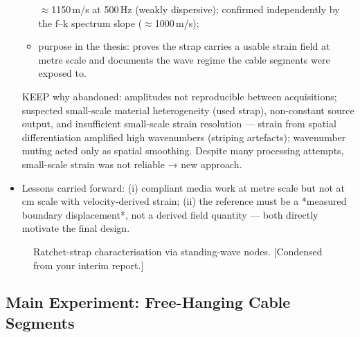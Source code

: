 \begin{itemize}
\begin{itemize}
        $\approx$1150\,m/s at 500\,Hz (weakly dispersive); confirmed
        independently by the f–k spectrum slope ($\approx$1000\,m/s);
      \item purpose in the thesis: proves the strap carries a usable strain
        field at metre scale and documents the wave regime the cable
        segments were exposed to.
    \end{itemize}
  \item [KEEP] why abandoned: amplitudes not reproducible between
    acquisitions; suspected small-scale material heterogeneity (used strap),
    non-constant source output, and insufficient small-scale strain
    resolution — strain from spatial differentiation amplified high
    wavenumbers (striping artefacts); wavenumber muting acted only as
    spatial smoothing. Despite many processing attempts, small-scale strain
    was not reliable → new approach.
  \item Lessons carried forward: (i) compliant media work at metre scale but
    not at cm scale with velocity-derived strain; (ii) the reference must be
    a *measured boundary displacement*, not a derived field quantity —
    both directly motivate the final design.
\end{itemize}

\begin{figure}[htb]
  \centering
  \caption{Ratchet-strap characterisation via standing-wave nodes.
    [Condensed from your interim report.]}
  \label{fig:methods:strap}
\end{figure}

\subsection{Main Experiment: Free-Hanging Cable Segments}
\label{sec:methods:campaign}

